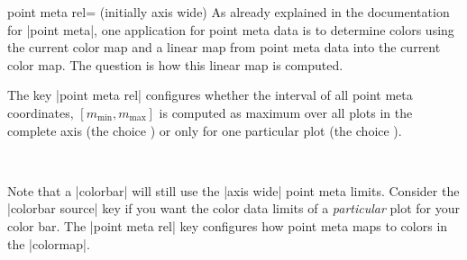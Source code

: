 \begin{pgfplotskey}{point meta rel= (initially axis wide)}
	As already explained in the documentation for |point meta|, one application for point meta data is to determine colors using the current color map and a linear map from point meta data into the current color map. The question is how this linear map is computed. 

	The key |point meta rel| configures whether the interval of all point meta coordinates, $[m_{\text{min}},m_{\text{max}}]$ is computed as maximum over all plots in the complete axis (the choice ) or only for one particular plot (the choice ).

%
\begin{codeexample}[]
~
\end{codeexample}

	Note that a |colorbar| will still use the |axis wide| point meta limits. Consider the |colorbar source| key if you want the color data limits of a \emph{particular} plot for your color bar. The |point meta rel| key configures how point meta maps to colors in the |colormap|.
\end{pgfplotskey}

